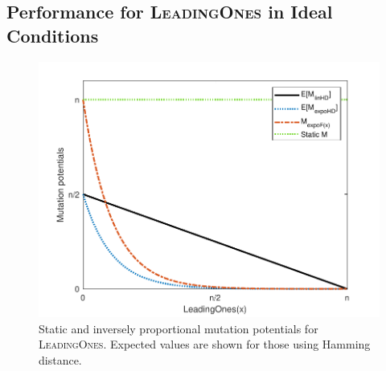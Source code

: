 \documentclass[lettersize,journal]{IEEEtran}
\begin{document}




\subsection{Performance for \textsc{LeadingOnes} in Ideal Conditions}
\begin{figure}[t!]
\centering
\includegraphics[width=\columnwidth]{b}
\caption{Static and inversely proportional  mutation potentials for \textsc{LeadingOnes}. Expected values are shown for those using Hamming distance.}
\label{fig:leadingones}
\end{figure}
\end{document}
